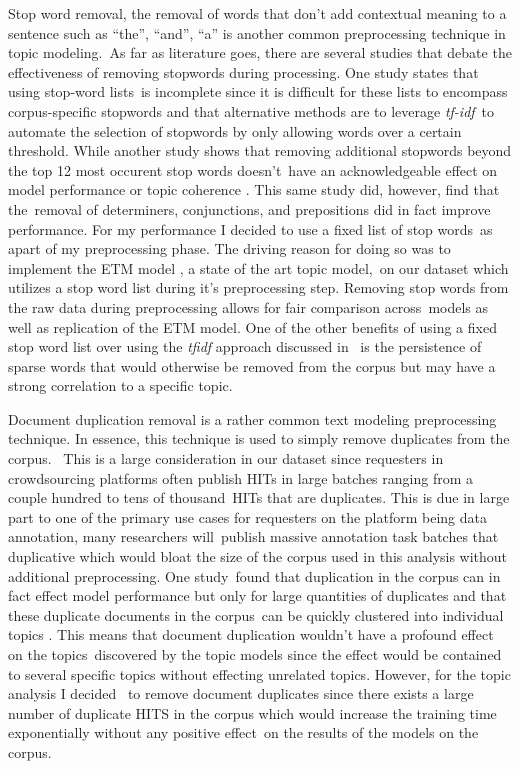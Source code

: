 \documentclass[letterpaper,12pt]{article}
\begin{document}
Stop word removal, the removal of words that don't add contextual meaning to a sentence such as ``the'', ``and'', ``a'' is another common preprocessing technique in topic modeling.\
As far as literature goes, there are several studies that debate the effectiveness of removing stopwords during processing. One study states that using stop-word lists\
is incomplete since it is difficult for these lists to encompass corpus-specific stopwords \cite{boyd2014care} and that alternative methods are to leverage \emph{tf-idf}\cite{Salton1968AutomaticIO}\
to automate the selection of stopwords by only allowing words over a certain threshold. While another study shows that removing additional stopwords beyond the top 12 most occurent stop words doesn't\
have an acknowledgeable effect on model performance or topic coherence \cite{schofieldunderstanding}. This same study did, however, find that the\
removal of determiners, conjunctions, and prepositions did in fact improve performance. For my performance I decided to use a fixed list of stop words\
as apart of my preprocessing phase. The driving reason for doing so was to implement the ETM model \cite{dieng2019topic}, a state of the art topic model,\
on our dataset which utilizes a stop word list during it's preprocessing step. Removing stop words from the raw data during preprocessing allows for fair comparison across\
models as well as replication of the ETM model. One of the other benefits of using a fixed stop word list over using the \emph{tfidf} approach discussed in \cite{boyd2014care}\
is the persistence of sparse words that would otherwise be removed from the corpus but may have a strong correlation to a specific topic.

Document duplication removal is a rather common text modeling preprocessing technique. In essence, this technique is used to simply remove duplicates from the corpus. \
This is a large consideration in our dataset since requesters in crowdsourcing platforms often publish HITs in large batches ranging from a couple hundred to tens of thousand\
HITs that are duplicates. This is due in large part to one of the primary use cases for requesters on the platform being data annotation, many researchers will\
publish massive annotation task batches that duplicative which would bloat the size of the corpus used in this analysis without additional preprocessing. One study\
found that duplication in the corpus can in fact effect model performance but only for large quantities of duplicates and that these duplicate documents in the corpus\
can be quickly clustered into individual topics \cite{schofieldunderstanding}. This means that document duplication wouldn't have a profound effect on the topics\
discovered by the topic models since the effect would be contained to several specific topics without effecting unrelated topics. However, for the topic analysis I decided \
to remove document duplicates since there exists a large number of duplicate HITS in the corpus which would increase the training time exponentially without any positive effect\
on the results of the models on the corpus.
\end{document}
